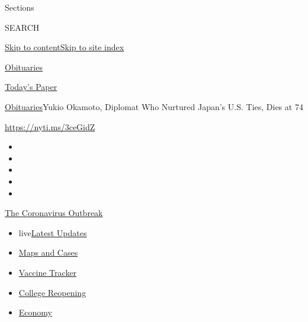 Sections

SEARCH

\protect\hyperlink{site-content}{Skip to
content}\protect\hyperlink{site-index}{Skip to site index}

\href{https://www.nytimes.com/section/obituaries}{Obituaries}

\href{https://myaccount.nytimes.com/auth/login?response_type=cookie\&client_id=vi}{}

\href{https://www.nytimes.com/section/todayspaper}{Today's Paper}

\href{/section/obituaries}{Obituaries}\textbar{}Yukio Okamoto, Diplomat
Who Nurtured Japan's U.S. Ties, Dies at 74

\url{https://nyti.ms/3ceGidZ}

\begin{itemize}
\item
\item
\item
\item
\item
\end{itemize}

\href{https://www.nytimes.com/news-event/coronavirus?action=click\&pgtype=Article\&state=default\&region=TOP_BANNER\&context=storylines_menu}{The
Coronavirus Outbreak}

\begin{itemize}
\tightlist
\item
  live\href{https://www.nytimes.com/2020/08/03/world/coronavirus-covid-19.html?action=click\&pgtype=Article\&state=default\&region=TOP_BANNER\&context=storylines_menu}{Latest
  Updates}
\item
  \href{https://www.nytimes.com/interactive/2020/us/coronavirus-us-cases.html?action=click\&pgtype=Article\&state=default\&region=TOP_BANNER\&context=storylines_menu}{Maps
  and Cases}
\item
  \href{https://www.nytimes.com/interactive/2020/science/coronavirus-vaccine-tracker.html?action=click\&pgtype=Article\&state=default\&region=TOP_BANNER\&context=storylines_menu}{Vaccine
  Tracker}
\item
  \href{https://www.nytimes.com/2020/08/02/us/covid-college-reopening.html?action=click\&pgtype=Article\&state=default\&region=TOP_BANNER\&context=storylines_menu}{College
  Reopening}
\item
  \href{https://www.nytimes.com/live/2020/08/03/business/stock-market-today-coronavirus?action=click\&pgtype=Article\&state=default\&region=TOP_BANNER\&context=storylines_menu}{Economy}
\end{itemize}

